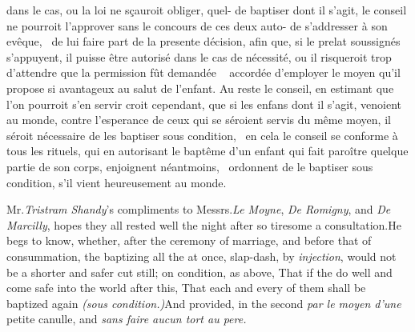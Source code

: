 \documentclass{article}
\begin{document}
dans le cas, ou la loi ne sçauroit obliger, quel-\break
{}\break
de baptiser dont il s’agit, le conseil ne pourroit\break
l’approver sans le concours de ces deux auto-\break
{}\break
de s’addresser à son evêque, \et\ de lui faire part\break
de la presente décision, afin que, si le prelat\break
{}\break
soussignés s’appuyent, il puisse être autorisé\break
dans le cas de nécessité, ou il risqueroit trop\break
d'attendre que la permission fût demandée \et\ \break
accordée d’employer le moyen qu’il propose si\break
avantageux au salut de l’enfant. Au reste\break
le conseil, en estimant que l’on pourroit s’en\break
servir croit cependant, que si les enfans dont\break
il s’agit, venoient au monde, contre l’esperance
de ceux qui se séroient servis du même moyen, il séroit nécessaire de
les baptiser \textnormal{sous cond\-ition,} \et\ en cela le conseil se conforme à
tous les rituels, qui en autorisant le baptême d’un enfant qui fait paroître quelque
partie de son corps, enjoignent néantmoins, \et\ ordonnent de le baptiser
\textnormal{sous condition}, s’il vient heu\-reusement au monde. 
\egroup 

\noindent
{}

\bigskip

\vbox{}

\bigskip

Mr.\@ \textit{Tristram Shandy}’s compliments to Messrs.\@ \textit{Le
Moyne}, \textit{De Romigny}, and \textit{De Marcilly}, hopes they all
rested well the night after so tiresome a consultation.\tsk\break He
begs to know, whether, after the ce\-remony of marriage, and before
that of consummation, the baptizing all the
 at once, slap-dash, by \textit{injection},
would not be a shorter and safer cut still; on condition, as above,
That if the  do well and come safe into
the world after this, That each and every of them shall be baptized
again \textit{(sous con\-dition.)}\tsh And provided, in the
second\break
{}
\textit{par le moyen d’une} petite canulle, and\break 
\textit{sans faire aucun tort au pere.}

\null
\end{document}
